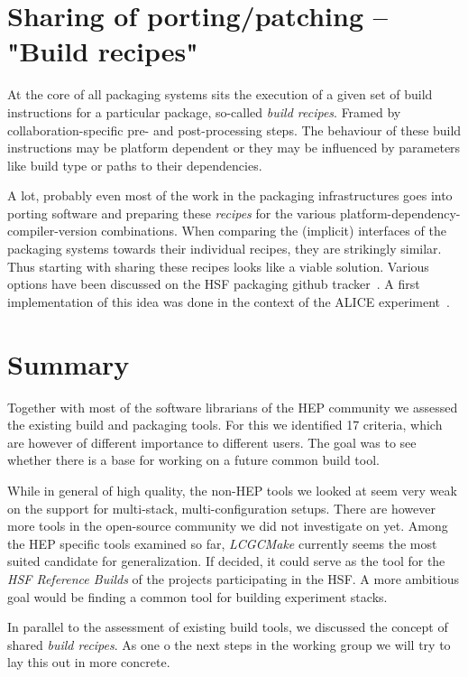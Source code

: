 \documentclass[12pt,a4paper]{article}
\begin{document}
\section{Sharing of porting/patching -- "Build recipes"}
At the core of all packaging systems sits the execution of a given set of build instructions for a particular package, so-called \emph{build recipes}. Framed by collaboration-specific pre- and post-processing steps. The behaviour of these build instructions may be platform dependent or they may be influenced by parameters like build type or paths to their dependencies. 

A lot, probably even most of the work in the packaging infrastructures goes into porting software and preparing these \emph{recipes} for the various platform-dependency-compiler-version combinations. When comparing the (implicit) interfaces of the packaging systems towards their individual recipes, they are strikingly similar. Thus starting with sharing these recipes looks like a viable solution. Various options have been discussed on the HSF packaging github tracker~\cite{github:discussion}. A first implementation of this idea was done in the context of the ALICE experiment~\cite{alidist}.

\section{Summary}
Together with most of the software librarians of the HEP community we assessed the existing build and packaging tools. For this we identified 17 criteria, which are however of different importance to different users. The goal was to see whether there is a base for working on a future common build tool. 

While in general of high quality, the non-HEP tools we looked at seem very weak on the support for multi-stack, multi-configuration setups. There are however more tools in the open-source community we did not investigate on yet.
Among the HEP specific tools examined so far, \emph{LCGCMake} currently seems the most suited candidate for generalization. If decided, it could serve as the tool for the \emph{HSF Reference Builds} of the projects participating in the HSF. A more ambitious goal would be finding a common tool for building experiment stacks.

In parallel to the assessment of existing build tools, we discussed the concept of shared \emph{build recipes}. As one o the next steps in the working group we will try to lay this out in more concrete.
\end{document}
